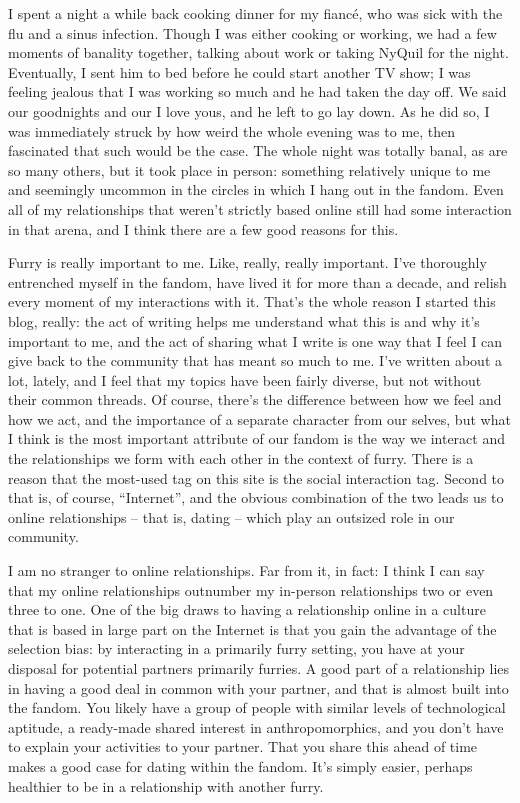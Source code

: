 
I spent a night a while back cooking dinner for my fianc\'{e}, who was sick with the flu and a sinus infection. Though I was either cooking or working, we had a few moments of banality together, talking about work or taking NyQuil for the night. Eventually, I sent him to bed before he could start another TV show; I was feeling jealous that I was working so much and he had taken the day off. We said our goodnights and our I love yous, and he left to go lay down. As he did so, I was immediately struck by how weird the whole evening was to me, then fascinated that such would be the case. The whole night was totally banal, as are so many others, but it took place in person: something relatively unique to me and seemingly uncommon in the circles in which I hang out in the fandom. Even all of my relationships that weren't strictly based online still had some interaction in that arena, and I think there are a few good reasons for this.

Furry is really important to me. Like, really, really important. I've thoroughly entrenched myself in the fandom, have lived it for more than a decade, and relish every moment of my interactions with it. That's the whole reason I started this blog, really: the act of writing helps me understand what this is and why it's important to me, and the act of sharing what I write is one way that I feel I can give back to the community that has meant so much to me. I've written about a lot, lately, and I feel that my topics have been fairly diverse, but not without their common threads. Of course, there's the difference between how we feel and how we act, and the importance of a separate character from our selves, but what I think is the most important attribute of our fandom is the way we interact and the relationships we form with each other in the context of furry. There is a reason that the most-used tag on this site is the social interaction tag. Second to that is, of course, “Internet”, and the obvious combination of the two leads us to online relationships -- that is, dating -- which play an outsized role in our community.

I am no stranger to online relationships. Far from it, in fact: I think I can say that my online relationships outnumber my in-person relationships two or even three to one. One of the big draws to having a relationship online in a culture that is based in large part on the Internet is that you gain the advantage of the selection bias: by interacting in a primarily furry setting, you have at your disposal for potential partners primarily furries. A good part of a relationship lies in having a good deal in common with your partner, and that is almost built into the fandom. You likely have a group of people with similar levels of technological aptitude, a ready-made shared interest in anthropomorphics, and you don't have to explain your activities to your partner. That you share this ahead of time makes a good case for dating within the fandom. It's simply easier, perhaps healthier to be in a relationship with another furry.

